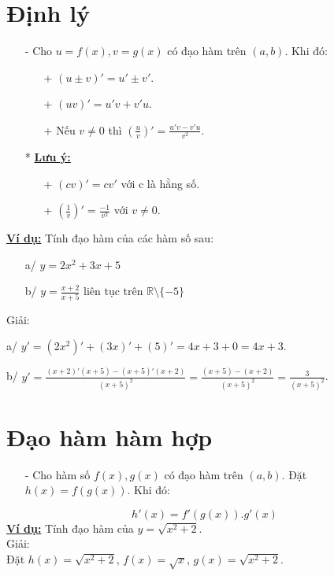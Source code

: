 \documentclass{article}
\begin{document}
\begin{Large}
		\section{Định lý}
		\begin{itemize}
			\item [-] Cho $u=f(x), v=g(x)$ có đạo hàm trên $(a,b)$. Khi đó:
			\begin{enumerate}
				\item [+]$(u\pm v)'=u'\pm v'$.
				\item [+]$(uv)'=u'v+v'u$.
				\item [+] Nếu $v\not =0$ thì $(\frac{u}{v})'=\frac{u'v-v'u}{v^2}$.
			\end{enumerate}
			\item[*]\textbf{\underline{Lưu ý:}} 
			\begin{itemize}
				\item[+] $(cv)'=cv'$ với c là hằng số.
				\item[+] $(\frac{1}{v})'=\frac{-1}{v^2}$ với $v\not =0$.
			\end{itemize}
		\end{itemize}
		\textbf{\underline{Ví dụ:}} Tính đạo hàm của các hàm số sau:
		\begin{itemize}
			\item [a/] $y=2x^2+3x+5$
			\item [b/] $y=\frac{x+2}{x+5}$ liên tục trên $\mathbb{R}\setminus\{-5\}$
		\end{itemize}
		Giải:
		
		\vspace{3mm}
		
		a/ $y'=(2x^2)'+(3x)'+(5)'=4x+3+0=4x+3$.
		
		\vspace{3mm}
		
		b/ $y'=\frac{(x+2)'(x+5)-(x+5)'(x+2)}{(x+5)^2}=\frac{(x+5)-(x+2)}{(x+5)^2}=\frac{3}{(x+5)^2}$.
		\section{Đạo hàm hàm hợp}
		\begin{itemize}
			\item [-]Cho hàm số $f(x), g(x)$ có đạo hàm trên $(a,b)$. Đặt $h(x)=f(g(x))$. Khi đó:
		\end{itemize}
		$$h'(x)=f'(g(x)).g'(x)$$
		\textbf{\underline{Ví dụ:}} Tính đạo hàm của $y=\sqrt{x^2+2}$.\\
		Giải:\\
		Đặt $h(x)=\sqrt{x^2+2}$, $f(x)=\sqrt{x}$, $g(x)=\sqrt{x^2+2}$.
		

\end{Large}
\end{document}
